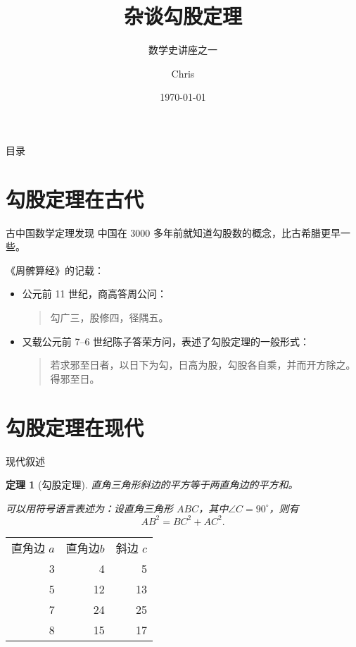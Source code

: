 \documentclass[xcolor=table]{beamer}
\title{杂谈勾股定理}
\subtitle{数学史讲座之一}
\institute{九章学堂}
\author{Chris}
\date{\today}
\newtheorem{thm}{定理}
\begin{document}
\begin{frame}
\titlepage
\end{frame}

\begin{frame}{目录}
\tableofcontents
\end{frame}

\section{勾股定理在古代}
\begin{frame}{古中国数学}{定理发现}
中国在 3000 多年前就知道勾股数的概念，比古希腊更早一些。

《周髀算经》的记载：
\begin{itemize}
\item 公元前 11 世纪，商高答周公问：
\begin{quote}
勾广三，股修四，径隅五。
\end{quote}
\item 又载公元前 7--6 世纪陈子答荣方问，表述了勾股定理的一般形式：
\begin{quote}
若求邪至日者，以日下为勾，日高为股，勾股各自乘，并而开方除之。得邪至日。
\end{quote}
\end{itemize}
\end{frame}

\section{勾股定理在现代}
\begin{frame}{现代叙述}
\begin{thm}[勾股定理]
直角三角形斜边的平方等于两直角边的平方和。

可以用符号语言表述为：设直角三角形 $ABC$，其中$\angle C = 90^{\circ}$，则有
\begin{equation}
AB^{2}=BC^{2}+AC^{2}.
\end{equation}
\begin{center}
\end{center}
\end{thm}
\end{frame}

\begin{frame}
\begin{tabular}{rrr}
\rowcolor{craneorange}直角边 $a$ & 直角边$b$ & 斜边 $c$\\
3 & 4 & 5 \\
5 & 12 & 13\\
7 & 24 & 25\\
8 & 15 & 17\\
\end{tabular}
\end{frame}
\end{document}
